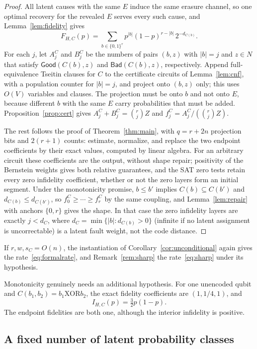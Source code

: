 \documentclass[11pt]{article}
\theoremstyle{remark}
\newcommand{\Good}{\mathsf{Good}}
\newcommand{\Bad}{\mathsf{Bad}}
\begin{document}
\begin{proof}
All latent causes with the same \(E\) induce the same erasure channel,
so one optimal recovery for the revealed \(E\) serves every such cause,
and Lemma~\ref{lem:fidelity} gives
\[
 F_{H,C}(p)=\sum_{b\in\{0,1\}^r}
       p^{|b|}(1-p)^{r-|b|}\,2^{-d_{C(b)}}.
\]
For each \(j\), let \(A_j^C\) and \(B_j^C\) be the numbers of pairs
\((b,z)\) with \(|b|=j\) and \(z\in N\) that satisfy \(\Good(C(b),z)\)
and \(\Bad(C(b),z)\), respectively. Append full-equivalence Tseitin
clauses for \(C\) to the certificate circuits of Lemma~\ref{lem:cnf},
with a population counter for \(|b|=j\), and project onto \((b,z)\)
only; this uses \(O(V)\) variables and clauses. The projection must be
onto \(b\) and not onto \(E\), because different \(b\) with the same
\(E\) carry probabilities that must be added.
Proposition~\ref{prop:cert} gives \(A_j^C+B_j^C=\binom rjZ\) and
\(f_j^C=A_j^C/(\binom rjZ)\).

The rest follows the proof of Theorem~\ref{thm:main}, with \(q=r+2n\)
projection bits and \(2(r+1)\) counts: estimate, normalize, and replace
the two endpoint coefficients by their exact values, computed by linear
algebra. For an arbitrary circuit these coefficients are the output,
without shape repair; positivity of the Bernstein weights gives both
relative guarantees, and the SAT zero tests retain every zero infidelity
coefficient, whether or not the zero layers form an initial segment.
Under the monotonicity promise, \(b\le b'\) implies
\(C(b)\subseteq C(b')\) and \(d_{C(b)}\le d_{C(b')}\), so
\(f_0^C\ge\cdots\ge f_r^C\) by the same coupling, and
Lemma~\ref{lem:repair} with anchors \(\{0,r\}\) gives the shape. In that
case the zero infidelity layers are exactly \(j<d_C\), where
\(d_C=\min\{|b|:d_{C(b)}>0\}\) (infinite if no latent assignment is
uncorrectable) is a latent fault weight, not the code distance.
\end{proof}

If \(r,w,s_C=O(n)\), the instantiation of
Corollary~\ref{cor:unconditional} again gives the
rate~\eqref{eq:formalrate}, and Remark~\ref{rem:sharp} the
rate~\eqref{eq:sharp} under its hypothesis.

Monotonicity genuinely needs an additional hypothesis. For one
unencoded qubit and \(C(b_1,b_2)=b_1\mathbin{\mathrm{XOR}}b_2\),
the exact fidelity coefficients are \((1,1/4,1)\), and
\[
 I_{H,C}(p)=\tfrac32p(1-p).
\]
The endpoint fidelities are both one, although the interior
infidelity is positive.

\subsection{A fixed number of latent probability classes}
\label{sec:multiclass}
\end{document}
